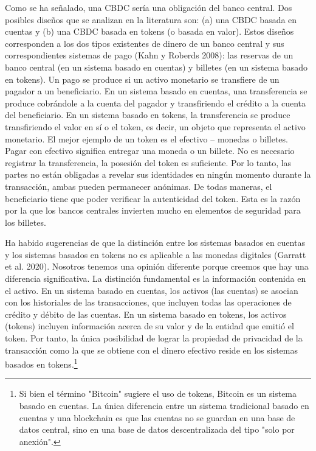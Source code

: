 \documentclass[10pt,spanish]{article}
\begin{document}
Como se ha señalado, una CBDC sería una obligación del banco central.
Dos posibles diseños que se analizan en la literatura son: (a) una CBDC
basada en cuentas y (b) una CBDC basada en tokens (o basada en valor).
Estos diseños corresponden a los dos tipos existentes de dinero de un
banco central y sus correspondientes sistemas de pago (Kahn y Roberds
2008): las reservas de un banco central (en un sistema basado en
cuentas) y billetes (en un sistema basado en tokens). Un pago se produce
si un activo monetario se transfiere de un pagador a un beneficiario. En
un sistema basado en cuentas, una transferencia se produce cobrándole a
la cuenta del pagador y transfiriendo el crédito a la cuenta del
beneficiario. En un sistema basado en tokens, la transferencia se
produce transfiriendo el valor en sí o el token, es decir, un objeto que
representa el activo monetario. El mejor ejemplo de un token es el
efectivo -- monedas o billetes. Pagar con efectivo significa entregar
una moneda o un billete. No es necesario registrar la transferencia, la
posesión del token es suficiente. Por lo tanto, las partes no están
obligadas a revelar sus identidades en ningún momento durante la
transacción, ambas pueden permanecer anónimas. De todas maneras, el
beneficiario tiene que poder verificar la autenticidad del token. Esta
es la razón por la que los bancos centrales invierten mucho en elementos
de seguridad para los billetes.

Ha habido sugerencias de que la distinción entre los sistemas basados en
cuentas y los sistemas basados en tokens no es aplicable a las monedas
digitales (Garratt et al. 2020). Nosotros tenemos una opinión diferente
porque creemos que hay una diferencia significativa. La distinción
fundamental es la información contenida en el activo. En un sistema
basado en cuentas, los activos (las cuentas) se asocian con los
historiales de las transacciones, que incluyen todas las operaciones de
crédito y débito de las cuentas. En un sistema basado en tokens, los
activos (tokens) incluyen información acerca de su valor y de la entidad
que emitió el token. Por tanto, la única posibilidad de lograr la
propiedad de privacidad de la transacción como la que se obtiene con el
dinero efectivo reside en los sistemas basados en tokens.\footnote
{Si bien el término "Bitcoin" sugiere el uso de tokens, Bitcoin es un
sistema basado en cuentas. La única diferencia entre un sistema
tradicional basado en cuentas y una blockchain es que las cuentas no
se guardan en una base de datos central, sino en una base de datos
descentralizada del tipo "solo por anexión".}
\end{document}
